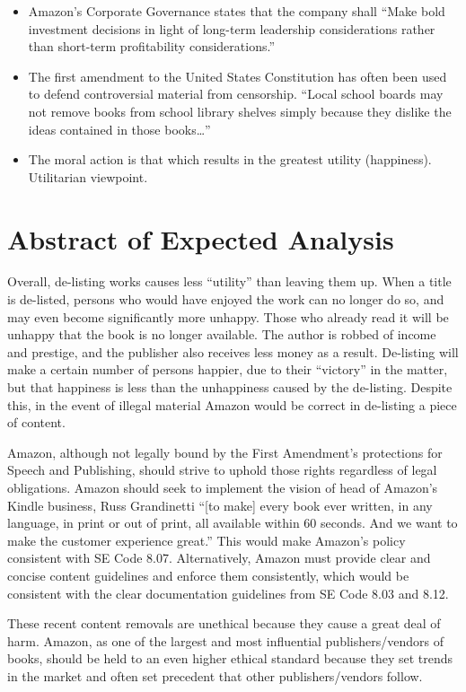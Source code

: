 \documentclass[10pt]{article}
\begin{document}
\begin{multicols}{2}
\begin{itemize}
\item Amazon's Corporate Governance states that the company shall ``Make bold investment decisions in light of long-term leadership considerations rather than short-term profitability considerations.'' \cite{AmazonCorpGovernance}

\item The first amendment to the United States Constitution has often been used to defend controversial material from censorship.  ``Local school boards may not remove books from school library shelves simply because they dislike the ideas contained in those books\ldots'' \cite{BOEvsPico}

\item The moral action is that which results in the greatest utility (happiness).  Utilitarian viewpoint.

\end{itemize}

\section{Abstract of Expected Analysis}
Overall, de-listing works causes less ``utility'' than leaving them up.  When a title is de-listed, persons who would have enjoyed the work can no longer do so, and may even become significantly more unhappy.  Those who already read it will be unhappy that the book is no longer available.  The author is robbed of income and prestige, and the publisher also receives less money as a result.  De-listing will make a certain number of persons happier, due to their ``victory'' in the matter, but that happiness is less than the unhappiness caused by the de-listing.  Despite this, in the event of illegal material Amazon would be correct in de-listing a piece of content.

Amazon, although not legally bound by the First Amendment's protections for Speech and Publishing, should strive to uphold those rights regardless of legal obligations.  Amazon should seek to implement the vision of head of Amazon's Kindle business, Russ Grandinetti ``[to make] every book ever written, in any language, in print or out of print, all available within 60 seconds. And we want to make the customer experience great.'' This would make Amazon's policy consistent with SE Code 8.07.  Alternatively, Amazon must provide clear and concise content guidelines and enforce them consistently, which would be consistent with the clear documentation guidelines from SE Code 8.03 and 8.12.

These recent content removals are unethical because they cause a great deal of harm.  Amazon, as one of the largest and most influential publishers/vendors of books, should be held to an even higher ethical standard because they set trends in the market and often set precedent that other publishers/vendors follow.

\end{multicols}

\nocite{*}




\end{document}
